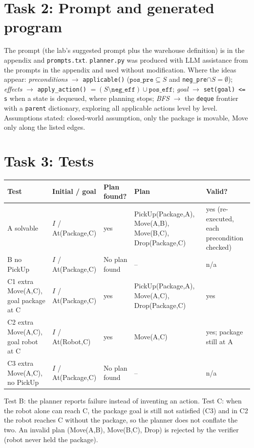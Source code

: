 \documentclass[10pt,a4paper]{article}
\begin{document}
\section*{Task 2: Prompt and generated program}
The prompt (the lab's suggested prompt plus the warehouse definition) is in the appendix and \texttt{prompts.txt}. \texttt{planner.py} was produced with LLM assistance from the prompts in the appendix and used without modification. Where the ideas appear: \emph{preconditions} $\to$ \texttt{applicable()} ($\texttt{pos\_pre}\subseteq S$ and \texttt{neg\_pre}$\cap S=\emptyset$); \emph{effects} $\to$ \texttt{apply\_action()} $=(S\setminus \texttt{neg\_eff})\cup\texttt{pos\_eff}$; \emph{goal} $\to$ \texttt{set(goal) <= s} when a state is dequeued, where planning stops; \emph{BFS} $\to$ the \texttt{deque} frontier with a \texttt{parent} dictionary, exploring all applicable actions level by level. Assumptions stated: closed-world assumption, only the package is movable, Move only along the listed edges.

\section*{Task 3: Tests}
\begin{center}\begin{tabular}{p{2.7cm}p{3.2cm}p{2cm}p{5cm}p{1.5cm}}\toprule
Test & Initial / goal & Plan found? & Plan & Valid?\\\midrule
A solvable & $I$ / At(Package,C) & yes & PickUp(Package,A), Move(A,B), Move(B,C), Drop(Package,C) & yes (re-executed, each precondition checked)\\
B no PickUp & $I$ / At(Package,C) & No plan found & -- & n/a\\
C1 extra Move(A,C), goal package at C & $I$ / At(Package,C) & yes & PickUp(Package,A), Move(A,C), Drop(Package,C) & yes\\
C2 extra Move(A,C), goal robot at C & $I$ / At(Robot,C) & yes & Move(A,C) & yes; package still at A\\
C3 extra Move(A,C), no PickUp & $I$ / At(Package,C) & No plan found & -- & n/a\\\bottomrule\end{tabular}\end{center}
Test B: the planner reports failure instead of inventing an action. Test C: when the robot alone can reach C, the package goal is still not satisfied (C3) and in C2 the robot reaches C without the package, so the planner does not conflate the two. An invalid plan (Move(A,B), Move(B,C), Drop) is rejected by the verifier (robot never held the package).
\end{document}
